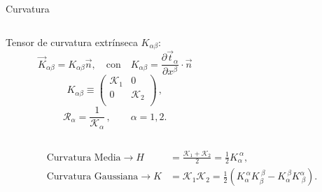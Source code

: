 \documentclass[xcolor=dvipsnames]{beamer}
\begin{document}
\begin{frame}{Curvatura}
  \begin{columns}[T]
    \begin{column}{6.2cm}
      \centering
      Tensor de curvatura extrínseca $K_{\alpha\beta}$:
      \begin{equation*}
        \vec{K}_{\alpha\beta}=K_{\alpha\beta}\vec{n}, \quad\text{con}\quad
        K_{\alpha\beta}=\frac{\partial \vec{t}_{\alpha}}{\partial
          x^{\beta}}\cdot \vec{n}
      \end{equation*}
      \begin{equation*}
        K_{\alpha\beta}\equiv\left(\begin{array}{cc}
            \mathcal{K}_1 & 0\\
            0 & \mathcal{K}_2\\
          \end{array}\right)\, ,
      \end{equation*}
      \begin{equation*}
        \mathcal{R}_{\alpha}=\frac{1}{\mathcal{K}_{\alpha}} \, , \qquad \alpha=1,2.
      \end{equation*}  
    \end{column}
    \begin{column}{6.25cm}
      \centering
      \begin{figure}[h]
        \resizebox{\columnwidth}{!}{}
      \end{figure} 
    \end{column}
  \end{columns}   
  \begin{align*}
    \text{Curvatura Media}\longrightarrow H&=\frac{\mathcal{K}_1+\mathcal{K}_2}{2}=\frac{1}{2}K_{\alpha}^{\ \alpha},\\
    \text{Curvatura Gaussiana}\longrightarrow  K&=\mathcal{K}_1\mathcal{K}_2=\frac{1}{2}(K_{\alpha}^{\ \alpha}K_{\beta}^{\ \beta}-K_{\alpha}^{\ \beta}K^{\alpha}_{\ \beta}).
  \end{align*}
\end{frame}
\end{document}
